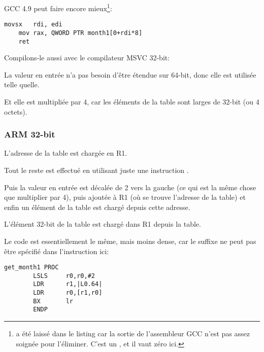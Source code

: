 GCC 4.9 \Optimizing peut faire encore mieux\footnote{ a été laissé dans le
listing car la sortie de l'assembleur GCC n'est pas assez soignée pour l'éliminer.
C'est un , et il vaut zéro ici.}:

\begin{lstlisting}[caption=GCC 4.9 \Optimizing x64,style=customasmx86]
	movsx	rdi, edi
	mov	rax, QWORD PTR month1[0+rdi*8]
	ret
\end{lstlisting}


Compilons-le aussi avec le compilateur MSVC 32-bit:



La valeur en entrée n'a pas besoin  d'être étendue sur 64-bit, donc elle est utilisée
telle quelle.

Et elle est multipliée par 4, car les éléments de la table sont larges de 32-bit
(ou 4 octets).

\subsubsection{ARM 32-bit}





L'adresse de la table est chargée en R1.

Tout le reste est effectué en utilisant juste une instruction \LDR.

Puis la valeur en entrée est décalée de 2 vers la gauche (ce qui est la même chose
que multiplier par 4), puis ajoutée à R1 (où se trouve l'adresse de la table) et
enfin un élément de la table est chargé depuis cette adresse.

L'élément 32-bit de la table est chargé dans R1 depuis la table.


Le code est essentiellement le même, mais moins dense, car le suffixe \LSL ne peut
pas être spécifié dans l'instruction \LDR ici:

\begin{lstlisting}[style=customasmARM]
get_month1 PROC
        LSLS     r0,r0,#2
        LDR      r1,|L0.64|
        LDR      r0,[r1,r0]
        BX       lr
        ENDP
\end{lstlisting}

